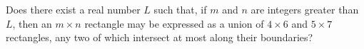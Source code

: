 Does there exist a real number $L$ such that, if $m$ and $n$ are integers
greater than $L$, then an $m \times n$ rectangle may be expressed as a
union of $4 \times 6$ and $5 \times 7$ rectangles, any two of which
intersect at most along their boundaries?
